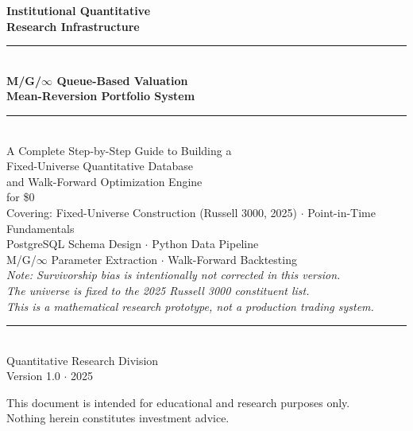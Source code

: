\documentclass[11pt, oneside]{book}
\begin{document}
\begin{titlepage}
    \pagecolor{quantblue}
    \color{white}
    \vspace*{2cm}
    \begin{center}
        {\Huge\bfseries Institutional Quantitative\\[0.3em]
        Research Infrastructure}\\[1.5em]
        {\rule{0.8\textwidth}{1pt}}\\[1.5em]
        {\Large\bfseries\color{quantgold} M/G/$\infty$ Queue-Based Valuation\\[0.3em]
        Mean-Reversion Portfolio System}\\[1.5em]
        {\rule{0.8\textwidth}{0.5pt}}\\[2em]
        {\large A Complete Step-by-Step Guide to Building a\\
        Fixed-Universe Quantitative Database\\
        and Walk-Forward Optimization Engine\\
        for \$0}\\[3em]
        {\normalsize\color{white!80}
        Covering: Fixed-Universe Construction (Russell 3000, 2025) $\cdot$ Point-in-Time Fundamentals\\
        PostgreSQL Schema Design $\cdot$ Python Data Pipeline\\
        M/G/$\infty$ Parameter Extraction $\cdot$ Walk-Forward Backtesting}\\[3em]
        {\small\color{quantgold}\textit{Note: Survivorship bias is intentionally not corrected in this version.\\
        The universe is fixed to the 2025 Russell 3000 constituent list.\\
        This is a mathematical research prototype, not a production trading system.}}\\[1em]
        {\rule{0.4\textwidth}{0.5pt}}\\[1em]
        {\normalsize Quantitative Research Division}\\[0.3em]
        {\small\color{white!70} Version 1.0 $\cdot$ 2025}
    \end{center}
    \vfill
    \begin{center}
        {\footnotesize\color{white!60}
        This document is intended for educational and research purposes only.\\
        Nothing herein constitutes investment advice.}
    \end{center}
\end{titlepage}
\pagecolor{white}
\color{black}
\end{document}
